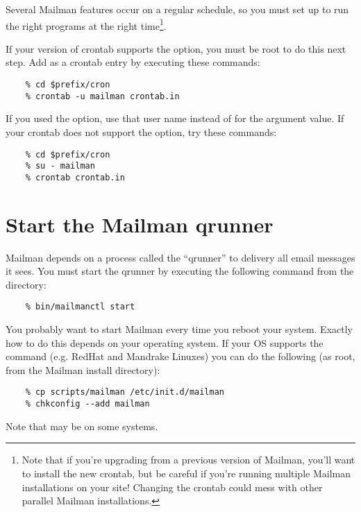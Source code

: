 \documentclass{howto}
\begin{document}
Several Mailman features occur on a regular schedule, so you must set up
 to run the right programs at the right time\footnote{Note that
if you're upgrading from a previous version of Mailman, you'll want to install
the new crontab, but be careful if you're running multiple Mailman
installations on your site!  Changing the crontab could mess with other
parallel Mailman installations.}.

If your version of crontab supports the  option, you must be
root to do this next step.  Add  as a
crontab entry by executing these commands:

\begin{verbatim}
    % cd $prefix/cron
    % crontab -u mailman crontab.in
\end{verbatim}

If you used the  option, use that user name
instead of  for the  argument value.  If your
crontab does not support the  option, try these commands:

\begin{verbatim}
    % cd $prefix/cron
    % su - mailman
    % crontab crontab.in
\end{verbatim}

\section{Start the Mailman qrunner}

Mailman depends on a process called the ``qrunner'' to delivery all
email messages it sees.  You must start the qrunner by executing the following
command from the  directory:

\begin{verbatim}
    % bin/mailmanctl start
\end{verbatim}

You probably want to start Mailman every time you reboot your system.  Exactly
how to do this depends on your operating system.  If your OS supports the
 command (e.g. RedHat and Mandrake Linuxes) you can
do the following (as root, from the Mailman install directory):

\begin{verbatim}
    % cp scripts/mailman /etc/init.d/mailman
    % chkconfig --add mailman
\end{verbatim}

Note that  may be  on some systems.
\end{document}
